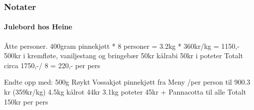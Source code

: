 \subsubsection{Notater}

\paragraph{Julebord hos Heine}
Åtte personer.
400gram pinnekjøtt * 8 personer = 3.2kg * 360kr/kg = 1150,-
500kr i kremfløte, vaniljestang og bringebær
50kr kålrabi
50kr i poteter
Totalt circa 1750,-/ 8 = 220,- per pers


Endte opp med:
500g Røykt Vossakjøt pinnekjøtt fra Meny /per person til 900.3 kr (359kr/kg)
4.5kg kålrot 44kr
3.1kg poteter 45kr
+ Pannacotta til alle
Totalt 150kr per pers
